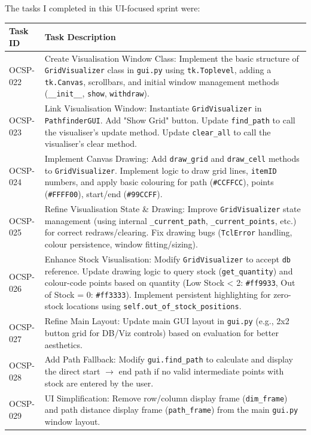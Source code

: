 The tasks I completed in this UI-focused sprint were:
\begin{table}[htbp]
	\centering
	\begin{tabularx}{\textwidth}{|l|X|}
		\hline
		\textbf{Task ID} & \textbf{Task Description} \\
		\hline
		OCSP-022 & Create Visualisation Window Class: Implement the basic structure of \verb|GridVisualizer| class in \verb|gui.py| using \verb|tk.Toplevel|, adding a \verb|tk.Canvas|, scrollbars, and initial window management methods (\verb|__init__|, \verb|show|, \verb|withdraw|). \\
		\hline
		OCSP-023 & Link Visualisation Window: Instantiate \verb|GridVisualizer| in \verb|PathfinderGUI|. Add "Show Grid" button. Update \verb|find_path| to call the visualiser's update method. Update \verb|clear_all| to call the visualiser's clear method. \\
		\hline
		OCSP-024 & Implement Canvas Drawing: Add \verb|draw_grid| and \verb|draw_cell| methods to \verb|GridVisualizer|. Implement logic to draw grid lines, \verb|itemID| numbers, and apply basic colouring for path (\verb|#CCFFCC|), points (\verb|#FFFF00|), start/end (\verb|#99CCFF|). \\
		\hline
		OCSP-025 & Refine Visualisation State \& Drawing: Improve \verb|GridVisualizer| state management (using internal \verb|_current_path|, \verb|_current_points|, etc.) for correct redraws/clearing. Fix drawing bugs (\verb|TclError| handling, colour persistence, window fitting/sizing). \\
		\hline
		OCSP-026 & Enhance Stock Visualisation: Modify \verb|GridVisualizer| to accept \verb|db| reference. Update drawing logic to query stock (\verb|get_quantity|) and colour-code points based on quantity (Low Stock < 2: \verb|#ff9933|, Out of Stock = 0: \verb|#ff3333|). Implement persistent highlighting for zero-stock locations using \verb|self.out_of_stock_positions|. \\
		\hline
		OCSP-027 & Refine Main Layout: Update main GUI layout in \verb|gui.py| (e.g., 2x2 button grid for DB/Viz controls) based on evaluation for better aesthetics. \\
		\hline
		OCSP-028 & Add Path Fallback: Modify \verb|gui.find_path| to calculate and display the direct start $ \rightarrow $ end path if no valid intermediate points with stock are entered by the user. \\
		\hline
		OCSP-029 & UI Simplification: Remove row/column display frame (\verb|dim_frame|) and path distance display frame (\verb|path_frame|) from the main \verb|gui.py| window layout. \\

\end{tabularx}
\end{table}
